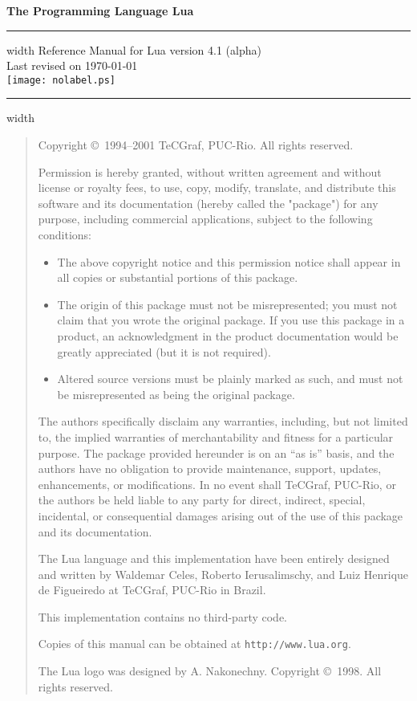 \documentclass[11pt]{article}
\newcommand{\Version}{4.1 (alpha)}
\begin{document}
\thispagestyle{empty}
\pagestyle{empty}

{
\parindent=0pt
{\LARGE\bf
The Programming Language Lua}
\hfill
\vskip4pt \hrule height 4pt width \hsize \vskip4pt
\hfill
Reference Manual for Lua version \Version
\\
\null
\hfill
Last revised on \today
\\
\vfill
\centering
\texttt{[image: nolabel.ps]}
\vfill
\vskip4pt \hrule height 2pt width \hsize
}

\newpage
\begin{quotation}
\parskip=10pt
\footnotesize
\null\vfill

\noindent
Copyright \copyright\ 1994--2001 TeCGraf, PUC-Rio.  All rights reserved.

\noindent
Permission is hereby granted, without written agreement and without license
or royalty fees, to use, copy, modify, translate, and distribute
this software and its documentation (hereby called the "package")
for any purpose, including commercial applications, subject to
the following conditions:
\begin{itemize}
\item The above copyright notice and this permission notice shall appear in all
   copies or substantial portions of this package.

\item The origin of this package must not be misrepresented; you must not
   claim that you wrote the original package. If you use this package in a
   product, an acknowledgment in the product documentation would be greatly
   appreciated (but it is not required).

\item Altered source versions must be plainly marked as such, and must not be
   misrepresented as being the original package.
\end{itemize}
The authors specifically disclaim any warranties, including, but not limited
to, the implied warranties of merchantability and fitness for a particular
purpose.  The package provided hereunder is on an ``as is'' basis, and the
authors have no obligation to provide maintenance, support, updates,
enhancements, or modifications.  In no event shall TeCGraf, PUC-Rio, or the
authors be held liable to any party for direct, indirect, special,
incidental, or consequential damages arising out of the use of this package
and its documentation.

\noindent
The Lua language and this implementation have been entirely designed and
written by Waldemar Celes, Roberto Ierusalimschy, and Luiz Henrique de
Figueiredo at TeCGraf, PUC-Rio in Brazil.

\noindent
This implementation contains no third-party code.

\noindent
Copies of this manual can be obtained at
\verb|http://www.lua.org|.

\bigskip
\noindent
The Lua logo was designed by A. Nakonechny.
Copyright \copyright\ 1998.  All rights reserved.
\end{quotation}
\newpage
\end{document}

